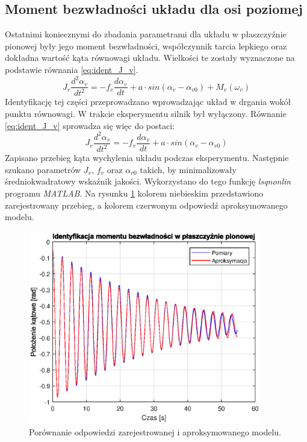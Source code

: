 \documentclass[11pt,a4paper]{article}
\begin{document}
\subsection{Moment bezwładności układu dla osi poziomej}
Ostatnimi koniecznymi do zbadania parametrami dla układu w płaszczyźnie pionowej były jego moment bezwładności, współczynnik tarcia lepkiego oraz dokładna wartość kąta równowagi układu. Wielkości te zostały wyznaczone na podstawie równania \eqref{eq:ident_J_v}.
\begin{equation}
J_v \frac{d^2\alpha_v}{dt^2} = -f_v\frac{d\alpha_v}{dt}+a\cdot sin(\alpha_v-\alpha_{v0})+M_v(\omega_v)
\label{eq:ident_J_v}
\end{equation}
Identyfikację tej części przeprowadzano wprowadzając układ w drgania wokół punktu równowagi. W trakcie eksperymentu silnik był wyłączony. Równanie \eqref{eq:ident_J_v} sprowadza się więc do postaci:
\begin{equation}
J_v \frac{d^2\alpha_v}{dt^2} = -f_v\frac{d\alpha_v}{dt}+a\cdot sin(\alpha_v-\alpha_{v0})
\end{equation}
Zapisano przebieg kąta wychylenia układu podczas eksperymentu. Następnie szukano parametrów \(J_v\), \(f_v\) oraz \(\alpha_{v0}\) takich, by minimalizowały średniokwadratowy wskaźnik jakości. Wykorzystano do tego funkcję \textit{lsqnonlin} programu \textit{MATLAB}. Na rysunku \ref{fig:ident_J_v} kolorem niebieskim przedstawiono zarejestrowany przebieg, a kolorem czerwonym odpowiedź aproksymowanego modelu.

\begin{figure}[H]
	\centering
	\includegraphics[width=4in]{Figures/ident_J_v.eps}
	\caption{Porównanie odpowiedzi zarejestrowanej i aproksymowanego modelu.}
	\label{fig:ident_J_v}
\end{figure}
\end{document}
